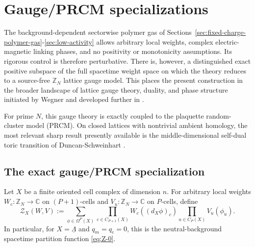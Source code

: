 \documentclass[dvipsnames,a4paper]{article}
\numberwithin{equation}{section}
\theoremstyle{definition}
\theoremstyle{remark}
\begin{document}
\section{Gauge/PRCM specializations}
\label{sec:specializations}

The background-dependent sectorwise polymer gas of
Sections~\ref{sec:fixed-charge-polymer-gas}-\ref{sec:low-activity} allows
arbitrary local weights, complex electric-magnetic linking phases, and no
positivity or monotonicity assumptions. Its rigorous control is therefore
perturbative. There is, however, a distinguished exact positive subspace of the
full spacetime weight space on which the theory reduces to a source-free
\(\mathbb Z_N\) lattice gauge model. This places the present construction in the
broader landscape of lattice gauge theory, duality, and phase structure
initiated by Wegner and developed further in
\cite{Wegner:1971app,FradkinShenker1979,BanksRabinovici1979}.

For prime \(N\), this gauge theory is exactly coupled to the plaquette
random-cluster model (PRCM). On closed lattices with nontrivial ambient
homology, the most relevant sharp result presently available is the
middle-dimensional self-dual toric transition of
Duncan-Schweinhart \cite{DuncanSchweinhartTopological}.

\subsection{The exact gauge/PRCM specialization}
\label{sec:specializations-gauge-prcm}

Let \(X\) be a finite oriented cell complex of dimension \(n\). For arbitrary
local weights \(W_c:\mathbb Z_N\to \mathbb C\) on \((P+1)\)-cells and
\(V_u:\mathbb Z_N\to \mathbb C\) on \(P\)-cells, define
\begin{equation}
	\mathcal Z_X(W,V)
	:=
	\sum_{\phi\in \Omega^P(X)}
	\prod_{c\in C_{P+1}(X)} W_c\left((d_X\phi)_c\right)
	\prod_{u\in C_P(X)} V_u(\phi_u).
	\label{eq:general-X}
\end{equation}
In particular, for \(X=\underline\Lambda\) and \(q_m=q_e=0\), this is the
neutral-background spacetime partition function \eqref{eq:Z-0}.
\end{document}
